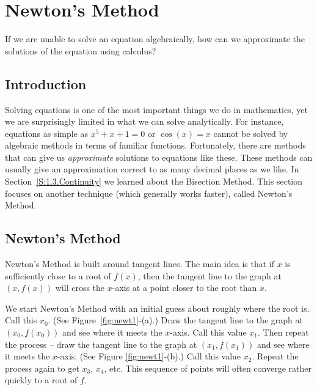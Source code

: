 \section{Newton's Method}\label{S:3.8.Newtons}

\begin{goals}%
\item If we are unable to solve an equation algebraically, how can we approximate the solutions of the equation using calculus?
\end{goals}

\subsection*{Introduction}

Solving equations is one of the most important things we do in mathematics, yet we are surprisingly limited in what we can solve analytically.  For instance, equations as simple as $x^5+x+1=0$ or $\cos(x) =x $ cannot be solved by algebraic methods in terms of familiar functions.  Fortunately, there are methods that can give us \textit{approximate} solutions to equations like these.  These methods can usually give an approximation correct to as many decimal places as we like. In Section~\ref{S:1.3.Continuity} we learned about the Bisection Method.  This section focuses on another technique (which generally works faster), called Newton's Method.


\subsection*{Newton's Method}

Newton's Method is built around tangent lines.  The main idea is that if $x$ is sufficiently close to a root of $f(x)$, then the  tangent line to the graph at $(x,f(x))$ will cross the $x$-axis at a point closer to the root than $x$.  

We start Newton's Method with an initial guess about roughly where the root is.  Call this $x_0$. (See Figure~\ref{fig:newt1}-(a).)  Draw the tangent line to the graph at $(x_0,f(x_0))$ and see where it meets the $x$-axis. Call this value $x_1$.  Then repeat the process -- draw the tangent line to the graph at $(x_1, f(x_1))$ and see where it meets the $x$-axis. (See Figure \ref{fig:newt1}-(b).) Call this value $x_2$.  Repeat the process again to get $x_3$, $x_4$, etc.  This sequence of points will often converge rather quickly to a root of $f$.  

